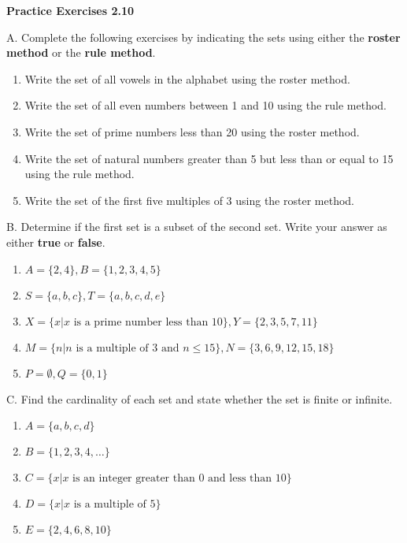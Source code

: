 \vspace{0.3ex}
\noindent\textbf{Practice Exercises 2.10}

\vspace{0.2ex}

\noindent A. Complete the following exercises by indicating the sets using either the \textbf{roster method} or the \textbf{rule method}.

\begin{enumerate}[label=\color{blue}\arabic*. , noitemsep]
    \item Write the set of all vowels in the alphabet using the roster method.
    \item Write the set of all even numbers between 1 and 10 using the rule method.
    \item Write the set of prime numbers less than 20 using the roster method.
    \item Write the set of natural numbers greater than 5 but less than or equal to 15 using the rule method.
    \item Write the set of the first five multiples of 3 using the roster method.
\end{enumerate}

\noindent B. Determine if the first set is a subset of the second set. Write your answer as either \textbf{true} or \textbf{false}. 

\begin{enumerate}[label=\color{blue}\arabic*. , noitemsep]
    \item \( A = \{2, 4\}, B = \{1, 2, 3, 4, 5\} \)
    \item \( S = \{a, b, c\}, T = \{a, b, c, d, e\} \)
    \item \( X = \{x | x \text{ is a prime number less than 10}\}, Y = \{2, 3, 5, 7, 11\} \)
    \item \( M = \{n | n \text{ is a multiple of 3 and } n \leq 15\}, N = \{3, 6, 9, 12, 15, 18\} \)
    \item \( P = \emptyset, Q = \{0, 1\} \)
\end{enumerate}

\noindent C. Find the cardinality of each set and state whether the set is finite or infinite.

\begin{enumerate}[label=\color{blue}\arabic*. , noitemsep]
    \item \( A = \{a, b, c, d\} \)
    \item \( B = \{1, 2, 3, 4, \ldots\} \)
    \item \( C = \{x | x \text{ is an integer greater than 0 and less than 10}\} \)
    \item \( D = \{x | x \text{ is a multiple of 5}\} \)
    \item \( E = \{2, 4, 6, 8, 10\} \)
\end{enumerate}
